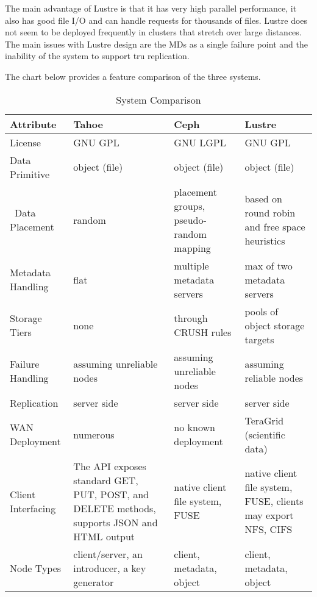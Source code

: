 \documentclass[11pt]{article}
\begin{document}
The main advantage of Lustre is that it has very high parallel 
performance, it also has good file I/O and can handle requests for 
thousands of files. Lustre does not seem to be deployed frequently 
in clusters that stretch over large distances. The main issues with 
Lustre design are the MDs as a single failure point and the inability of 
the system to support tru replication.

The chart below provides a feature comparison of the three systems.

\begin{table}
  \begin{center}
    \begin{tabular}{
        | p{} | p{} | p{} | p{} |
      }
      \hline
      Attribute & Tahoe & Ceph & Lustre \\ \hline
      License & GNU GPL & GNU LGPL & GNU GPL \\ \hline
      Data Primitive & object (file) & object (file) &
      object (file) \\ \hline\
      Data Placement & random & placement groups, pseudo-random mapping &   
      based on round robin and free space heuristics \\ \hline
      Metadata Handling & flat & multiple metadata servers & 
      max of two  metadata servers  \\ \hline
      Storage Tiers & none & through CRUSH rules & pools of object storage
      targets \\ \hline
      Failure Handling & assuming unreliable nodes & assuming unreliable
      nodes & assuming reliable nodes \\ \hline
      Replication & server side & server side & server side \\ \hline
      WAN Deployment & numerous & no known deployment & TeraGrid (scientific
      data) \\ \hline
      Client Interfacing &  The API exposes standard GET, PUT, POST, and
      DELETE methods, supports JSON and HTML output & native client file
      system, FUSE & native client file system, FUSE, clients may export
      NFS, CIFS \\ \hline
      Node Types & client/server, an introducer, a key generator & client,
      metadata, object & client, metadata, object \\ \hline
    \end{tabular}
    \caption{System Comparison}
    \label{tbl:syscomp}
  \end{center}
\end{table}
\end{document}
